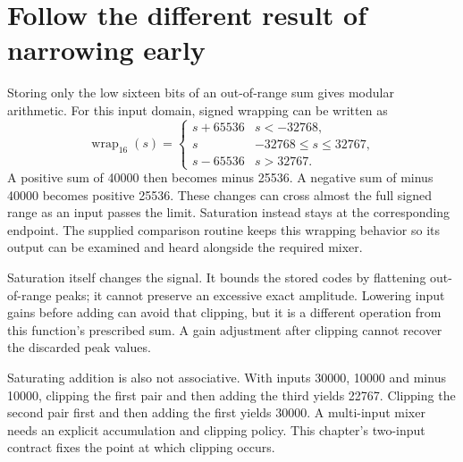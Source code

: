\section{Follow the different result of narrowing early}\label{pcm-wrapping}
Storing only the low sixteen bits of an out-of-range sum gives modular arithmetic.
For this input domain, signed wrapping can be written as
\[
 \operatorname{wrap}_{16}(s)=
 \begin{cases}
 s+65536 & s<-32768,\\
 s & -32768\leq s\leq32767,\\
 s-65536 & s>32767.
 \end{cases}
\]
A positive sum of 40000 then becomes minus 25536. A negative sum of minus 40000
becomes positive 25536. These changes can cross almost the full signed range as
an input passes the limit. Saturation instead stays at the corresponding endpoint.
The supplied comparison routine keeps this wrapping behavior so its output can be
examined and heard alongside the required mixer.

Saturation itself changes the signal. It bounds the stored codes by flattening
out-of-range peaks; it cannot preserve an excessive exact amplitude. Lowering input
gains before adding can avoid that clipping, but it is a different operation from
this function's prescribed sum. A gain adjustment after clipping cannot recover
the discarded peak values.

Saturating addition is also not associative. With inputs 30000, 10000 and minus
10000, clipping the first pair and then adding the third yields 22767. Clipping
the second pair first and then adding the first yields 30000. A multi-input mixer
needs an explicit accumulation and clipping policy. This chapter's two-input
contract fixes the point at which clipping occurs.
